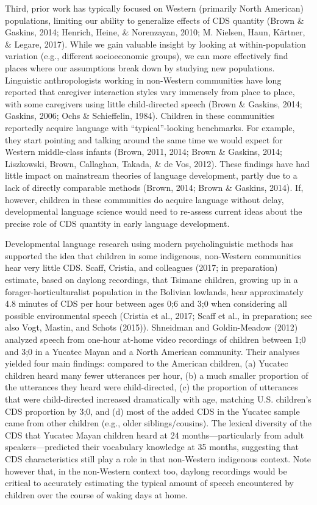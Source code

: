 \documentclass[floatsintext,man]{apa6}
\theoremstyle{definition}
\theoremstyle{definition}
\theoremstyle{definition}
\theoremstyle{remark}
\begin{document}
Third, prior work has typically focused on Western (primarily North
American) populations, limiting our ability to generalize effects of CDS
quantity (Brown \& Gaskins, 2014; Henrich, Heine, \& Norenzayan, 2010;
M. Nielsen, Haun, Kärtner, \& Legare, 2017). While we gain valuable
insight by looking at within-population variation (e.g., different
socioeconomic groups), we can more effectively find places where our
assumptions break down by studying new populations. Linguistic
anthropologists working in non-Western communities have long reported
that caregiver interaction styles vary immensely from place to place,
with some caregivers using little child-directed speech (Brown \&
Gaskins, 2014; Gaskins, 2006; Ochs \& Schieffelin, 1984). Children in
these communities reportedly acquire language with
\enquote{typical}-looking benchmarks. For example, they start pointing
and talking around the same time we would expect for Western
middle-class infants (Brown, 2011, 2014; Brown \& Gaskins, 2014;
Liszkowski, Brown, Callaghan, Takada, \& de Vos, 2012). These findings
have had little impact on mainstream theories of language development,
partly due to a lack of directly comparable methods (Brown, 2014; Brown
\& Gaskins, 2014). If, however, children in these communities do acquire
language without delay, developmental language science would need to
re-assess current ideas about the precise role of CDS quantity in early
language development.

Developmental language research using modern psycholinguistic methods
has supported the idea that children in some indigenous, non-Western
communities hear very little CDS. Scaff, Cristia, and colleagues (2017;
in preparation) estimate, based on daylong recordings, that Tsimane
children, growing up in a forager-horticulturalist population in the
Bolivian lowlands, hear approximately 4.8 minutes of CDS per hour
between ages 0;6 and 3;0 when considering all possible environmental
speech (Cristia et al., 2017; Scaff et al., in preparation; see also
Vogt, Mastin, and Schots (2015)). Shneidman and Goldin-Meadow (2012)
analyzed speech from one-hour at-home video recordings of children
between 1;0 and 3;0 in a Yucatec Mayan and a North American community.
Their analyses yielded four main findings: compared to the American
children, (a) Yucatec children heard many fewer utterances per hour, (b)
a much smaller proportion of the utterances they heard were
child-directed, (c) the proportion of utterances that were
child-directed increased dramatically with age, matching U.S. children's
CDS proportion by 3;0, and (d) most of the added CDS in the Yucatec
sample came from other children (e.g., older siblings/cousins). The
lexical diversity of the CDS that Yucatec Mayan children heard at 24
months---particularly from adult speakers---predicted their vocabulary
knowledge at 35 months, suggesting that CDS characteristics still play a
role in that non-Western indigenous context. Note however that, in the
non-Western context too, daylong recordings would be critical to
accurately estimating the typical amount of speech encountered by
children over the course of waking days at home.
\end{document}
